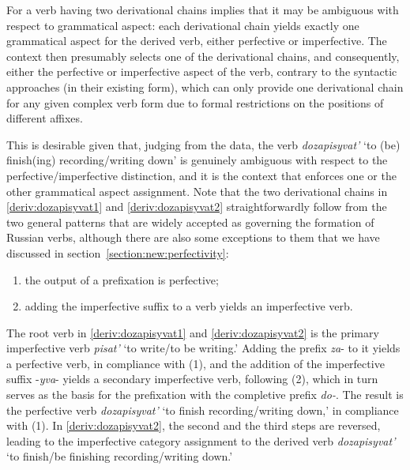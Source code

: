 For a verb having two derivational chains implies that it may be ambiguous with respect to grammatical aspect: each derivational chain yields exactly one grammatical aspect for the derived verb, either perfective or imperfective. The context then presumably selects one of the derivational chains, and consequently, either the perfective or imperfective aspect of the verb, contrary to the syntactic approaches (in their existing form), which can only provide one derivational chain for any given complex verb form due to formal restrictions on the positions of different affixes.

This is desirable given that, judging from the data, the verb \textit{dozapisyvat'} `to (be) finish(ing) recording/writing down' is genuinely ambiguous with respect to the perfective/imperfective distinction, and it is the context that enforces one or the other grammatical aspect assignment. Note that the two derivational chains in \ref{deriv:dozapisyvat1} and \ref{deriv:dozapisyvat2} straightforwardly follow from the two general patterns that are widely accepted as governing the formation of Russian verbs, although there are also some exceptions to them that we have discussed in section~\ref{section:new:perfectivity}:

\begin{enumerate}
\item the output of a prefixation is perfective;   
\item adding the imperfective suffix to a verb yields an imperfective verb. 
\end{enumerate}

The root verb in \ref{deriv:dozapisyvat1} and \ref{deriv:dozapisyvat2} is the primary imperfective verb \textit{pisat'} `to write/to be writing.' Adding the prefix \textit{za}- to it yields a perfective verb, in compliance with (1), and the addition of the imperfective suffix -\textit{yva}- yields a secondary imperfective verb, following (2), which in turn serves as the basis for the prefixation with the completive prefix \textit{do-}. The result is the perfective verb \textit{dozapisyvat'} `to finish recording/writing down,' in compliance with (1).  In \ref{deriv:dozapisyvat2}, the second and the third steps are reversed, leading to the imperfective category assignment to the derived verb \textit{dozapisyvat'} `to finish/be finishing recording/writing down.'

